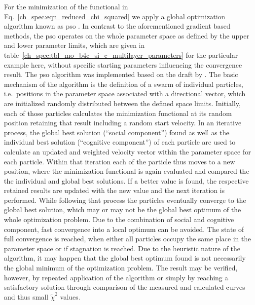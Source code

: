 For the minimization of the functional in Eq.~\eqref{ch_spec:eqn_reduced_chi_squared} we apply a global optimization algorithm known as \gls{pso} \cite{kennedy_particle_2011}. In contrast to the aforementioned gradient based methods, the \gls{pso} operates on the whole parameter space as defined by the upper and lower parameter limits, which are given in table~\ref{ch_spec:tbl_mo_b4c_si_c_multilayer_parameters} for the particular example here, without specific starting parameters influencing the convergence result. The \gls{pso} algorithm was implemented based on the draft by \textcite{carlisle_off--shelf_2001}. The basic mechanism of the algorithm is the definition of a swarm of individual particles, i.e.~positions in the parameter space associated with a directional vector, which are initialized randomly distributed between the defined space limits. Initially, each of those particles calculates the minimization functional at its random position retaining that result including a random start velocity. In an iterative process, the global best solution (``social component'') found as well as the individual best solution (``cognitive component'') of each particle are used to calculate an updated and weighted velocity vector within the parameter space for each particle. Within that iteration each of the particle thus moves to a new position, where the minimization functional is again evaluated and compared the the individual and global best solutions. If a better value is found, the respective retained results are updated with the new value and the next iteration is performed. While following that process the particles eventually converge to the global best solution, which may or may not be the global best optimum of the whole optimization problem. Due to the combination of social and cognitive component, fast convergence into a local optimum can be avoided. The state of full convergence is reached, when either all particles occupy the same place in the parameter space or if stagnation is reached. Due to the heuristic nature of the algorithm, it may happen that the global best optimum found is not necessarily the global minimum of the optimization problem. The result may be verified, however, by repeated application of the algorithm or simply by reaching a satisfactory solution through comparison of the measured and calculated curves and thus small $\tilde{\chi}^2$ values.

